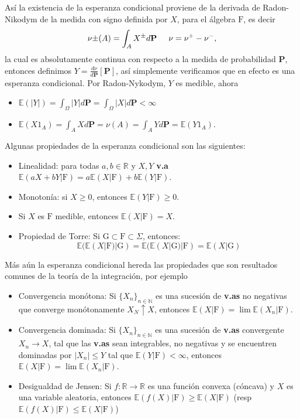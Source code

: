 \documentclass[letterpaper]{book}
\newcommand{\nat}{\ensuremath{ \mathbb N }}
\newcommand{\prob}{\textbf{P}}
\newcommand{\esp}{\mathbb E}
\newcommand{\om}{\ensuremath{\Omega}}
\newcommand{\sig}{\ensuremath{\Sigma}}
\newcommand{\re}{\ensuremath{\mathbb R }}
\begin{document}
\noindent Así la existencia de la esperanza condicional proviene de la derivada de Radon-Nikodym de la medida con signo definida por \(X\), para el álgebra \(\mathrm{F}\), es decir
\[
    \nu{\pm}(A)=\int_{A}X^{\pm}d\prob\hspace{0.5cm}\nu=\nu^{+}-\nu^{-},
\]
\noindent la cual es absolutamente continua con respecto a la medida de probabilidad \textbf{P}, entonces definimos \(Y=\frac{d\nu}{d\prob}[\prob]\), así simplemente verificamos que en efecto es una esperanza condicional. Por Radon-Nykodym, \(Y\) es medible, ahora

\begin{itemize}
\item \(\esp(|Y|)=\int_{\om}|Y|d\prob=\int_{\om}|X|d\prob<\infty\)
\item \(\esp(X1_A)=\int_{A}Xd\prob=\nu(A)=\int_{A}Yd\prob=\esp(Y1_A)\).
\end{itemize}

Algunas propiedades de la esperanza condicional son las siguientes:

\begin{itemize}
\item Linealidad: para todas \(a,b\in\re\) y \(X,Y\) \textbf{v.a} \(\esp(aX+bY|\mathrm{F})=a\esp(X|\mathrm{F})+b\esp(Y|\mathrm{F})\).
\item Monotonía: si \(X\geq0\), entonces \(\esp(Y|\mathrm{F})\geq 0\).
\item Si \(X\) es \(\mathrm{F}\) medible, entonces \(\esp(X|\mathrm{F})=X\).
\item Propiedad de Torre: Si \(\mathrm{G}\subset\mathrm{F}\subset\sig\), entonces:
\[
        \esp(\esp(X|\mathrm{F})|\mathrm{G})=\esp(\esp(X|\mathrm{G})|\mathrm{F})=\esp(X|\mathrm{G})
  \]
\end{itemize}

Más aún la esperanza condicional hereda las propiedades que son resultados comunes de la teoría de la integración, por ejemplo
\begin{itemize}
\item Convergencia monótona: Si \(\{X_n\}_{n\in\nat}\) es una sucesión de \textbf{v.as} no negativas que converge monótonamente \(X_N\uparrow X\), entonces \(\esp(X|\mathrm{F})=\lim\esp(X_n|\mathrm{F})\).
\item Convergencia dominada: Si \(\{X_n\}_{n\in\nat}\) es una sucesión de \textbf{v.as} convergente \(X_n\rightarrow X\), tal que las \textbf{v.as} sean integrables, no negativas y se encuentren dominadas por \(|X_n|\leq Y\) tal que \(\esp(Y|\mathrm{F})<\infty\),  entonces \(\esp(X|\mathrm{F})=\lim\esp(X_n|\mathrm{F})\).
\item Desigualdad de Jensen: Si \(f:\re\rightarrow\re\) es una función convexa (cóncava) y \(X\) es una variable aleatoria, entonces \(\esp(f(X)|\mathrm{F})\geq\esp(X|\mathrm{F})\) (resp \(\esp(f(X)|\mathrm{F})\leq\esp(X|\mathrm{F})\))
\end{itemize}
\end{document}
